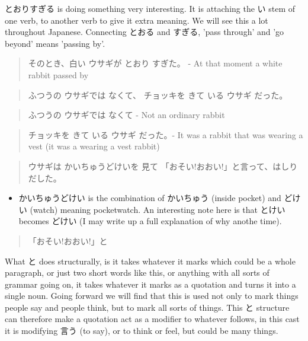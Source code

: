 \documentclass[11pt]{article}
\begin{document}
とおりすぎる is doing something very interesting. It is attaching the い stem of one verb, to another verb to give it extra meaning. We will see this a lot throughout Japanese. Connecting とおる and すぎる, 'pass through' and 'go beyond' means 'passing by'.
\begin{quote}
そのとき、白い ウサギが とおり すぎた。 - At that moment a white rabbit passed by
\end{quote}

\begin{quote}
ふつうの ウサギでは なくて、 チョッキを きて いる ウサギ だった。
\end{quote}
\begin{quote}
ふつうの ウサギでは なくて - Not an ordinary rabbit
\end{quote}

\begin{quote}
チョッキを きて いる ウサギ だった。- It was a rabbit that was wearing a vest (it was a wearing a vest rabbit)
\end{quote}


\begin{quote}
ウサギは かいちゅうどけいを 見て 「おそい!おおい!」と言って、はしり だした。
\end{quote}
\begin{itemize}
\item かいちゅうどけい is the combination of かいちゅう (inside pocket) and どけい (watch) meaning pocketwatch. An interesting note here is that とけい becomes どけい (I may write up a full explanation of why anothe time).
\end{itemize}

\begin{quote}
「おそい!おおい!」と
\end{quote}
What と does structurally, is it takes whatever it marks which could be a whole paragraph, or just two short words like this, or anything with all sorts of grammar going on, it takes whatever it marks as a quotation and turns it into a single noun. Going forward we will find that this is used not only to mark things people say and people think, but to mark all sorts of things. This と structure can therefore make a quotation act as a modifier to whatever follows, in this cast it is modifying 言う (to say), or to think or feel, but could be many things.
\end{document}
